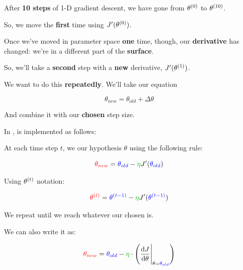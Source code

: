         \miniex After \textbf{10 steps} of 1-D gradient descent, we have gone from $\theta^{(0)}$ to $\theta^{(10)}$.
        
        So, we move the \textbf{first} time using $J'(\theta^{(0)})$.
        
        Once we've moved in parameter space \textbf{one} time, though, our \textbf{derivative} has changed: we're in a different part of the \textbf{surface}.
        
        So, we'll take a \textbf{second} step with a \textbf{new} derivative, $J'(\theta^{(1)})$.
        
        We want to do this \textbf{repeatedly}. We'll take our equation
        
        \begin{equation}
            \theta_{new} = \theta_{old} + \Delta \theta
        \end{equation}
        
        And combine it with our \textbf{chosen} step size.\\
        
        \begin{kequation}
            In ,  is implemented as follows:
        
            At each time step $t$, we  our hypothesis $\theta$ using the following rule:
            
            \begin{equation*}
                \red{ \theta_{new} } = 
                \blu{ \theta_{old} } - \grn{\eta} J'( \blu{ \theta_{old} })
            \end{equation*}
            
            Using $\theta^{(t)}$ notation:
            
            \begin{equation*}
                \red{ \ex{\theta}{t} } = 
                \blu{ \ex{\theta}{t-1} } -
                \grn{\eta} J'( \blu{ \ex{\theta}{t-1} })
            \end{equation*}
            
            We repeat until we reach whatever our chosen  is.
        \end{kequation}
        
        We can also write it as:
        
        \begin{equation*}
                \red{ \theta_{new} } = 
                \blu{ \theta_{old} } - 
                \grn{\eta} \cdot
                \left( \deriv{J}{ \theta } \Bigg|_{\theta=\blu{ \theta_{old} }} \right)
            \end{equation*}
        
